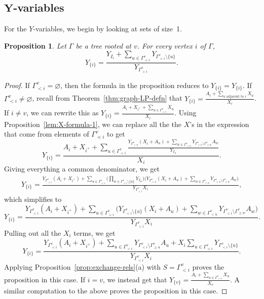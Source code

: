 \documentclass[10pt,a4paper]{amsart}
\numberwithin{equation}{section}
\newtheorem{Proposition}[Theorem]{Proposition}
 { \theoremstyle{definition}
\newtheorem{Definition}[Theorem]{Definition}
\newtheorem{Note}[Theorem]{Note}
\newtheorem{Example}[Theorem]{Example}
\newtheorem{Remark}[Theorem]{Remark} }
\newcommand{\new}[1]{{#1}}
\begin{document}
\subsection[Y-variables]{$\boldsymbol{Y}$-variables}\label{sec:Y-formulas}
For the $Y$-variables, we begin by looking at sets of size~1.
\begin{Proposition}\label{prop:Y-single-formula}
Let $\Gamma$ be a tree rooted at $v$. For every vertex $i$ of $\Gamma$,
\[ Y_{\{i\}}=\frac{Y_{I_i}+\sum_{u\in\Gamma_{\lessdot i}^v}Y_{\Gamma_{< i}^v\setminus\{u\}}}{Y_{\Gamma_{< i}^v}}.\]
\end{Proposition}
\begin{proof}
If $\Gamma_{< i}^v=\varnothing$, then the formula in the proposition reduces to $Y_{\{i\}}=Y_{\{i\}}$.
If $\Gamma_{< i}^v\neq\varnothing$, recall from Theorem~\ref{thm:graph-LP-defn} that $Y_{\{i\}}=\frac{A_i+\sum_{u\text{ adjacent to }i}X_u}{X_i}$. If $i\neq v$, we can rewrite this as $Y_{\{i\}}=\frac{A_i+X_{i^+}+\sum_{u\in\Gamma_{\lessdot i}^v}X_u}{X_i}$. Using Proposition~\ref{lem:X-formula-1}, we can replace all the the $X$'s in the expression that come from elements of $\Gamma_{\lessdot i}^v$ to get
\[ Y_{\{i\}}=\frac{A_i+X_{i^+}+\sum_{u\in\Gamma_{\lessdot i}^v}\frac{Y_{\Gamma_{< u}^v}(X_i+A_u)+\sum_{w\in \Gamma_{< u}^v}Y_{\Gamma_{< u}^v\setminus\Gamma_{\geq w}^v}A_w}{Y_{I_u}}}{X_i}.\]
Giving everything a common denominator, we get
\begin{gather*}
 Y_{\{i\}}=\frac{Y_{\Gamma_{< i}^v}(A_i+X_{i^+})+\sum\limits_{u\in\Gamma_{\lessdot i}^v}\Big(\prod\limits_{w\in\Gamma_{\lessdot i}^v\setminus\{u\}}Y_{I_w}\Big)\Big(Y_{\Gamma_{< u}^v}(X_i+A_u)+\sum\limits_{w\in \Gamma_{< u}^v}Y_{\Gamma_{< u}^v\setminus\Gamma_{\geq w}^v}A_w\Big)}{Y_{\Gamma_{< i}^v}X_i},
 \end{gather*}
which simplifies to
\[ Y_{\{i\}}=\frac{Y_{\Gamma_{< i}^v}(A_i+X_{i^+})+\sum_{u\in\Gamma_{\lessdot i}^v}\Big(Y_{\Gamma_{< i}^v\setminus\{u\}}(X_i+A_u)+\sum_{w\in \Gamma_{< u}^v}Y_{\Gamma_{< i}^v\setminus\Gamma_{\geq w}^v}A_w\Big)}{Y_{\Gamma_{< i}^v}X_i}.\]
Pulling out all the $X_i$ terms, we get
\[ Y_{\{i\}}=\frac{Y_{\Gamma_{< i}^v}(A_i+X_{i^+})+\sum_{u\in\Gamma_{< i}^v}Y_{\Gamma_{< i}^v\setminus\Gamma_{\geq u}^v}A_u+X_i\sum_{u\in\Gamma_{\lessdot i}^v}Y_{\Gamma_{< i}^v\setminus\{u\}}}{Y_{\Gamma_{< i}^v}X_i}.\]
Applying Proposition~\ref{prop:exchange-rels}(a) with $S=\Gamma_{< i}^v$ proves the \new{proposition} in this case.
If $i=v$, we instead get that $Y_{\{v\}}=\frac{A_i+\sum_{u\in\Gamma_{\lessdot v}^v}X_u}{X_v}$. A similar computation to the above proves the \new{proposition} in this case.
\end{proof}
\end{document}

